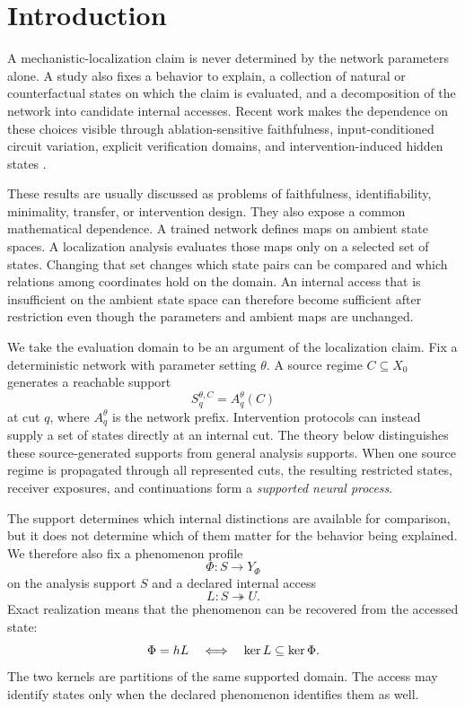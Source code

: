 \section{Introduction}

A mechanistic-localization claim is never determined by the network parameters alone. A study also fixes a behavior to explain, a collection of natural or counterfactual states on which the claim is evaluated, and a decomposition of the network into candidate internal accesses. Recent work makes the dependence on these choices visible through ablation-sensitive faithfulness, input-conditioned circuit variation, explicit verification domains, and intervention-induced hidden states \citep{miller2024faithfulness,bayat2026many,hadad2026formal,makelov2024subspace,grant2026divergent}.

These results are usually discussed as problems of faithfulness, identifiability, minimality, transfer, or intervention design. They also expose a common mathematical dependence. A trained network defines maps on ambient state spaces. A localization analysis evaluates those maps only on a selected set of states. Changing that set changes which state pairs can be compared and which relations among coordinates hold on the domain. An internal access that is insufficient on the ambient state space can therefore become sufficient after restriction even though the parameters and ambient maps are unchanged.

We take the evaluation domain to be an argument of the localization claim. Fix a deterministic network with parameter setting $\theta$. A source regime $C\subseteq X_0$ generates a reachable support
\[
S_q^{\theta,C}=A_q^\theta(C)
\]
at cut $q$, where $A_q^\theta$ is the network prefix. Intervention protocols can instead supply a set of states directly at an internal cut. The theory below distinguishes these source-generated supports from general analysis supports. When one source regime is propagated through all represented cuts, the resulting restricted states, receiver exposures, and continuations form a \emph{supported neural process}.

The support determines which internal distinctions are available for comparison, but it does not determine which of them matter for the behavior being explained. We therefore also fix a phenomenon profile
\[
\Phi:S\to Y_\Phi
\]
on the analysis support $S$ and a declared internal access
\[
L:S\twoheadrightarrow U.
\]
Exact realization means that the phenomenon can be recovered from the accessed state:
\begin{equation}
\Phi=hL
\quad\Longleftrightarrow\quad
\operatorname{ker} L\subseteq\operatorname{ker}\Phi.
\label{eq:intro-realization}
\end{equation}
The two kernels are partitions of the same supported domain. The access may identify states only when the declared phenomenon identifies them as well.

